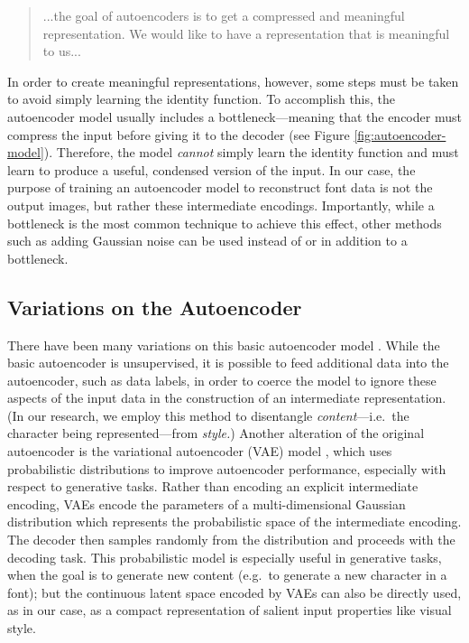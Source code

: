 \begin{quote}
    ...the goal of autoencoders is to get a compressed and meaningful
    representation. We would like to have a representation that is meaningful to us...
\end{quote}

In order to create meaningful representations, however, some steps must be taken to avoid simply learning the identity function. To accomplish this, the autoencoder model usually includes a bottleneck---meaning that the encoder must compress the input before giving it to the decoder (see Figure \ref{fig:autoencoder-model}). Therefore, the model \emph{cannot} simply learn the identity function and must learn to produce a useful, condensed version of the input. In our case, the purpose of training an autoencoder model to reconstruct font data is not the output images, but rather these intermediate encodings. Importantly, while a bottleneck is the most common technique to achieve this effect, other methods such as adding Gaussian noise \cite{bank2021autoencoders} can be used instead of or in addition to a bottleneck.

\subsection{Variations on the Autoencoder}

There have been many variations on this basic autoencoder model \cite{michelucci2022}. While the basic autoencoder is unsupervised, it is possible to feed additional data into the autoencoder, such as data labels, in order to coerce the model to ignore these aspects of the input data in the construction of an intermediate representation. (In our research, we employ this method to disentangle \textit{content}---i.e.\ the character being represented---from \textit{style.}) Another alteration of the original autoencoder is the variational autoencoder (VAE) model \cite{kingma2013}, which uses probabilistic distributions to improve autoencoder performance, especially with respect to generative tasks. Rather than encoding an explicit intermediate encoding, VAEs encode the parameters of a multi-dimensional Gaussian distribution which represents the probabilistic space of the intermediate encoding. The decoder then samples randomly from the distribution and proceeds with the decoding task. This probabilistic model is especially useful in generative tasks, when the goal is to generate new content (e.g.\ to generate a new character in a font); but the continuous latent space encoded by VAEs can also be directly used, as in our case, as a compact representation of salient input properties like visual style.

